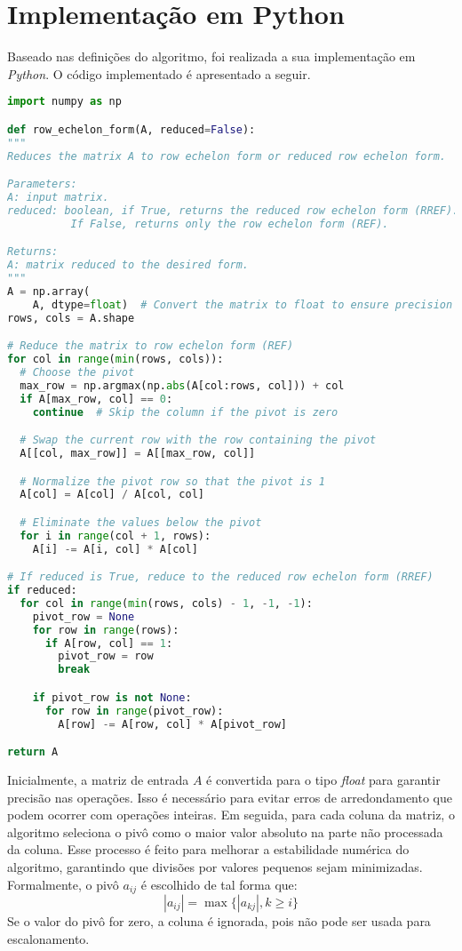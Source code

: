 \section{Implementação em Python}

Baseado nas definições do algoritmo, foi realizada a sua implementação em {\it Python}. O código implementado é apresentado a seguir.

\vspace{8pt}
\begin{lstlisting}[language=Python, caption={Implementação do algoritmo para obtenção da REF e RREF de uma matriz.}]
import numpy as np

def row_echelon_form(A, reduced=False):
"""
Reduces the matrix A to row echelon form or reduced row echelon form.

Parameters:
A: input matrix.
reduced: boolean, if True, returns the reduced row echelon form (RREF).
          If False, returns only the row echelon form (REF).

Returns:
A: matrix reduced to the desired form.
"""
A = np.array(
    A, dtype=float)  # Convert the matrix to float to ensure precision
rows, cols = A.shape

# Reduce the matrix to row echelon form (REF)
for col in range(min(rows, cols)):
  # Choose the pivot
  max_row = np.argmax(np.abs(A[col:rows, col])) + col
  if A[max_row, col] == 0:
    continue  # Skip the column if the pivot is zero

  # Swap the current row with the row containing the pivot
  A[[col, max_row]] = A[[max_row, col]]

  # Normalize the pivot row so that the pivot is 1
  A[col] = A[col] / A[col, col]

  # Eliminate the values below the pivot
  for i in range(col + 1, rows):
    A[i] -= A[i, col] * A[col]

# If reduced is True, reduce to the reduced row echelon form (RREF)
if reduced:
  for col in range(min(rows, cols) - 1, -1, -1):
    pivot_row = None
    for row in range(rows):
      if A[row, col] == 1:
        pivot_row = row
        break

    if pivot_row is not None:
      for row in range(pivot_row):
        A[row] -= A[row, col] * A[pivot_row]

return A
\end{lstlisting}

Inicialmente, a matriz de entrada $A$ é convertida para o tipo \textit{float} para garantir precisão nas operações. Isso é necessário para evitar erros de arredondamento que podem ocorrer com operações inteiras. Em seguida, para cada coluna da matriz, o algoritmo seleciona o pivô como o maior valor absoluto na parte não processada da coluna. Esse processo é feito para melhorar a estabilidade numérica do algoritmo, garantindo que divisões por valores pequenos sejam minimizadas. Formalmente, o pivô \( a_{ij} \) é escolhido de tal forma que:
\begin{equation}
    |a_{ij}| = \max \{|a_{kj}|, k \geq i\}
\end{equation}
Se o valor do pivô for zero, a coluna é ignorada, pois não pode ser usada para escalonamento.

